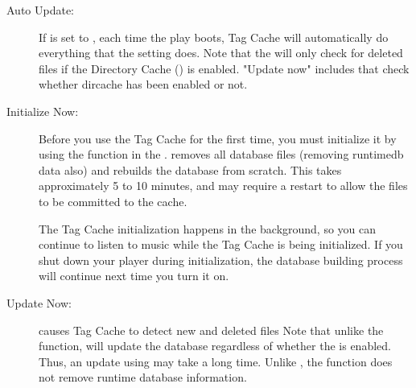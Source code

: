 	\begin{description}

		\item[Auto Update:  ]
		If  is set to , each time the play
		boots, Tag Cache will automatically do everything that the 
		 setting does.  Note that the  will only check for deleted files if the Directory Cache
		() is enabled.  
		"Update now" includes that check whether dircache has been enabled or not.

		\item[Initialize Now:  ]
		Before you use the Tag Cache for the first time, you must initialize it by 
		using the  function in the .   removes all database files (removing 
		runtimedb data also) and rebuilds the database from scratch. This takes 
		approximately 5 to 10 minutes, and may require a restart to allow the 
		files to be committed to the cache. 

		The Tag Cache initialization happens in the background, so you can continue 
		to listen to music while the Tag Cache is being initialized.  If you shut 
		down your player during initialization, the database building process will 
		continue next time you turn it on.

		\item[Update Now:  ]
		 causes Tag Cache to detect new and deleted files 
		Note that unlike the  function,  
		will update the database regardless of whether the 
		is enabled.  Thus, an update using  may take a long
		time.  Unlike , the  function 
		does not remove runtime database information.


\end{description}
